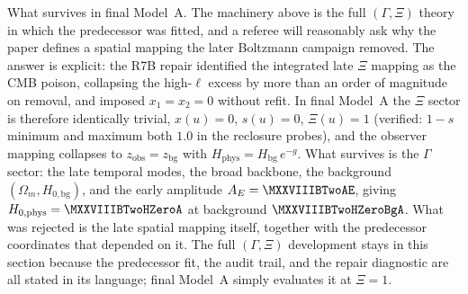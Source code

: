 What survives in final Model~A. The machinery above is the full
$(\Gamma,\Xi)$ theory in which the predecessor was fitted, and a
referee will reasonably ask why the paper defines a spatial mapping
the later Boltzmann campaign removed. The answer is explicit: the R7B
repair identified the integrated late $\Xi$ mapping as the CMB poison,
collapsing the high-$\ell$ excess by more than an order of magnitude
on removal, and imposed
$x_{1}=x_{2}=0$ without refit. In final Model~A the $\Xi$ sector is
therefore identically trivial, $x(u)=0$, $s(u)=0$, $\Xi(u)=1$
(verified: $1-s$ minimum and maximum both $1.0$ in the reclosure
probes), and the observer mapping collapses to $z_{\mathrm{obs}} =
z_{\mathrm{bg}}$ with $H_{\mathrm{phys}} = H_{\mathrm{bg}}\,e^{-g}$.
What survives is the $\Gamma$ sector: the late temporal modes, the
broad backbone, the background $(\Omega_{m}, H_{0,\mathrm{bg}})$, and
the early amplitude $A_{E} = \MXXVIIIBTwoAE$, giving
$H_{0,\mathrm{phys}} = \MXXVIIIBTwoHZeroA$\kmsMpc{} at background
$\MXXVIIIBTwoHZeroBgA$\kmsMpc{}. What was rejected is the late spatial
mapping itself, together with the predecessor coordinates that
depended on it. The full $(\Gamma,\Xi)$ development stays in this
section because the predecessor fit, the audit trail, and the repair
diagnostic are all stated in its language; final Model~A simply
evaluates it at $\Xi=1$.
